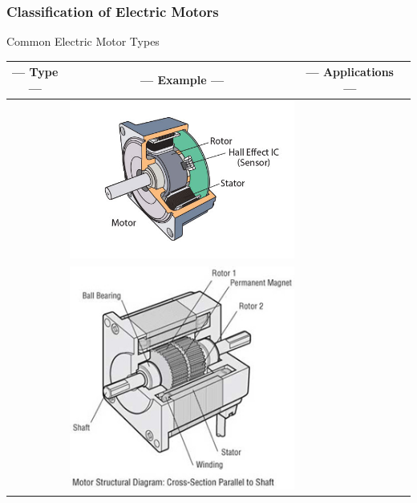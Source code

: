 \documentclass[fleqn]{beamer} %
\newcommand{\sectiontitleI}{Classification of Electric Motors}
\begin{document}
	\begin{frame}[label=sectionI] \small
		\frametitle{\sectiontitleI}	
		
		Common Electric Motor Types

		\begin{tabular}{|c|c|c|c|} 
			--- Type --- & --- Example --- & --- Applications --- \\ \hline  
			& \includegraphics[scale=.2]{images/brushless-dc-motor-structure-and-control.jpg} & \\ \hline                %
			& \includegraphics[scale=.2]{images/stepper-motor-structural-diagram.jpg} & \\ \hline                    %
		\end{tabular}

	\end{frame}
\end{document}
